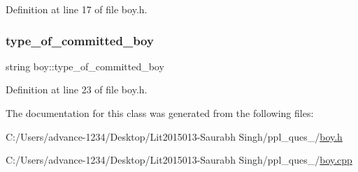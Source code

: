 Definition at line 17 of file boy.\+h.

\mbox{\label{classboy_abc7775597e8f8f89b44164bab24d188a}} 
\subsubsection{\texorpdfstring{type\+\_\+of\+\_\+committed\+\_\+boy}{type\_of\_committed\_boy}}
{\footnotesize\ttfamily string boy\+::type\+\_\+of\+\_\+committed\+\_\+boy}



Definition at line 23 of file boy.\+h.



The documentation for this class was generated from the following files\+:\begin{DoxyCompactItemize}
\item 
C\+:/\+Users/advance-\/1234/\+Desktop/\+Lit2015013-\/\+Saurabh Singh/ppl\+\_\+ques\+\_/\hyperlink{boy_8h}{boy.\+h}\item 
C\+:/\+Users/advance-\/1234/\+Desktop/\+Lit2015013-\/\+Saurabh Singh/ppl\+\_\+ques\+\_/\hyperlink{boy_8cpp}{boy.\+cpp}\end{DoxyCompactItemize}
